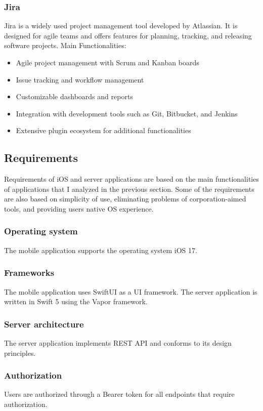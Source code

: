 \documentclass[
  biblatex = false,
  language=english,
  figures=false,
  sourcecodes,
  glossaries,
  index
]{kidiplom}
\begin{document}
\subsubsection{Jira}
Jira is a widely used project management tool developed by Atlassian. It is designed for agile teams and offers features for planning, tracking, and releasing software projects. Main Functionalities:
\begin{itemize}
	\item Agile project management with Scrum and Kanban boards
	\item Issue tracking and workflow management
         \item Customizable dashboards and reports
	\item Integration with development tools such as Git, Bitbucket, and Jenkins
	\item Extensive plugin ecosystem for additional functionalities
\end{itemize}

\subsection{Requirements}
Requirements of iOS and server applications are based on the main functionalities of applications that I analyzed in the previous section. Some of the requirements are also based on simplicity of use, eliminating problems of corporation-aimed tools, and providing users native OS experience.

\subsubsection{Operating system}
The mobile application supports the operating system iOS 17.

\subsubsection{Frameworks}
The mobile application uses SwiftUI as a UI framework. The server application is written in Swift 5 using the Vapor framework.

\subsubsection{Server architecture}
The server application implements REST API and conforms to its design principles.

\subsubsection{Authorization}
Users are authorized through a Bearer token for all endpoints that require authorization.
\end{document}
